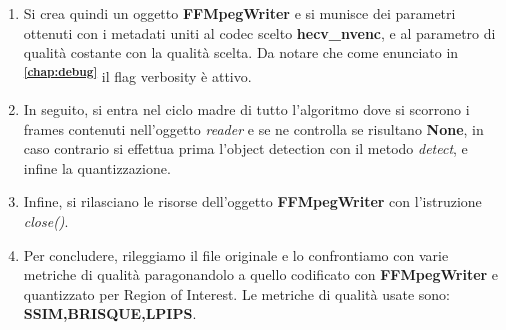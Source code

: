 \begin{enumerate}
\item Si crea quindi un oggetto \textbf{FFMpegWriter} e si munisce dei parametri ottenuti con i metadati uniti al codec scelto \textbf{hecv\_nvenc}, e al parametro di qualità costante con la qualità scelta. Da notare che come enunciato in \textsuperscript{\textbf{\ref{chap:debug}}} il flag verbosity è attivo.
\item In seguito, si entra nel ciclo madre di tutto l'algoritmo dove si scorrono i frames contenuti nell'oggetto \emph{reader} e se ne controlla se risultano \textbf{None}, in caso contrario si effettua prima l'object detection con il metodo \emph{detect}, e infine la quantizzazione.
\item Infine, si rilasciano le risorse dell'oggetto  \textbf{FFMpegWriter} con l'istruzione \emph{close()}.
\item Per concludere, rileggiamo il file originale e lo confrontiamo con varie metriche di qualità paragonandolo a quello codificato con \textbf{FFMpegWriter} e quantizzato per Region of Interest. Le metriche di qualità usate sono: \textbf{SSIM,BRISQUE,LPIPS}.
\end{enumerate}